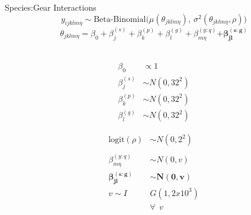 \documentclass[ xcolor = pdftex, dvipsnames, table ]{beamer}
\begin{document}
%
\begin{frame}{Species:Gear Interactions}
\vspace*{-0.5cm}
\begin{equation*}
        y_{ijklm\eta} \sim \text{Beta-Binomial}\Big(\mu( \theta_{jklm\eta}),~\sigma^2( \theta_{jklm\eta}, \rho) \Big)
\end{equation*}
\begin{equation*}
        \theta_{jklm\eta} = \beta_0 + \beta^{(s)}_j + \beta^{(p)}_k + \beta^{(g)}_l + \beta^{(y:q)}_{m\eta} \bm{+ \beta^{(s:g)}_{jl}} 
\end{equation*}
$~$\\
\vspace*{-0.25cm}
\hspace*{-0.5cm}
\begin{minipage}[h!]{0.3\textwidth}
	\begin{align*}
	\beta_0 &\propto 1\\
	\beta^{(s)}_j &\sim N(0, 32^2)\\
	\beta^{(p)}_k &\sim N(0, 32^2)\\
	\beta^{(g)}_l &\sim N(0, 32^2)
	\end{align*}
\end{minipage}
\begin{minipage}[h!]{0.39\textwidth}
	\begin{align*}
        \text{logit}(\rho) &\sim N(0, 2^2)\\
	&\\
	\beta^{(y:q)}_{m\eta} &\sim N(0,v)\\
	\bm{\beta^{(s:g)}_{jl}} &\bm{\sim N(0,v)}\\ 
        v\sim I&G(1,2x10^{3})\\
	&\forall ~~ v 
        \end{align*}

\end{minipage}
\end{frame}
\end{document}
